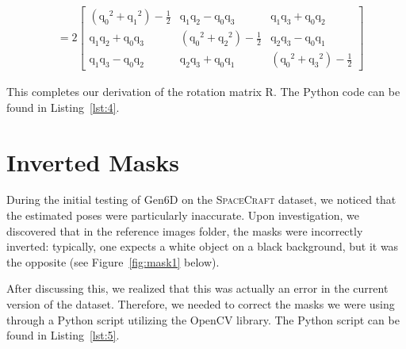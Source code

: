 \begin{align*}
		&=2
		\begin{bmatrix}
    	({\mathrm{q}_0}^2+{\mathrm{q}_1}^2)-\frac{1}{2} & \mathrm{q}_1\mathrm{q}_2-\mathrm{q}_0\mathrm{q}_3 & \mathrm{q}_1\mathrm{q}_3+\mathrm{q}_0\mathrm{q}_2 \\
    	\mathrm{q}_1\mathrm{q}_2+\mathrm{q}_0\mathrm{q}_3 & ({\mathrm{q}_0}^2+{\mathrm{q}_2}^2)-\frac{1}{2} & \mathrm{q}_2\mathrm{q}_3-\mathrm{q}_0\mathrm{q}_1 \\
    	\mathrm{q}_1\mathrm{q}_3-\mathrm{q}_0\mathrm{q}_2 & \mathrm{q}_2\mathrm{q}_3+\mathrm{q}_0\mathrm{q}_1 & ({\mathrm{q}_0}^2+{\mathrm{q}_3}^2)-\frac{1}{2}
		\end{bmatrix}
\end{align*} 

\bigskip

\noindent This completes our derivation of the rotation matrix $\bm{\mathrm{R}}$. The Python code can be found in Listing~\ref{lst:4}.

\section{Inverted Masks}

During the initial testing of Gen6D on the \textsc{SpaceCraft} dataset, we noticed that the estimated poses were particularly inaccurate. Upon investigation, we discovered that in the reference images folder, the masks were incorrectly inverted: typically, one expects a white object on a black background, but it was the opposite (see Figure~\ref{fig:mask1} below).

After discussing this, we realized that this was actually an error in the current version of the dataset. Therefore, we needed to correct the masks we were using through a Python script utilizing the OpenCV library. The Python script can be found in Listing~\ref{lst:5}.


\bigskip


